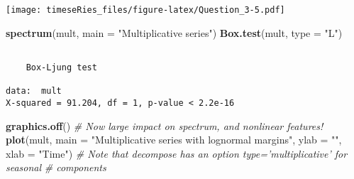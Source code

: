 \documentclass[]{book}
\newenvironment{Shaded}{\begin{snugshade}}{\end{snugshade}}
\newcommand{\KeywordTok}[1]{\textcolor[rgb]{0.13,0.29,0.53}{\textbf{#1}}}
\newcommand{\DataTypeTok}[1]{\textcolor[rgb]{0.13,0.29,0.53}{#1}}
\newcommand{\DecValTok}[1]{\textcolor[rgb]{0.00,0.00,0.81}{#1}}
\newcommand{\StringTok}[1]{\textcolor[rgb]{0.31,0.60,0.02}{#1}}
\newcommand{\CommentTok}[1]{\textcolor[rgb]{0.56,0.35,0.01}{\textit{#1}}}
\newcommand{\ControlFlowTok}[1]{\textcolor[rgb]{0.13,0.29,0.53}{\textbf{#1}}}
\newcommand{\OperatorTok}[1]{\textcolor[rgb]{0.81,0.36,0.00}{\textbf{#1}}}
\newcommand{\NormalTok}[1]{#1}
\begin{document}
\begin{Shaded}
\end{Shaded}

\texttt{[image: timeseRies\_files/figure-latex/Question\_3-5.pdf]}

\begin{Shaded}
\begin{Highlighting}[]
\KeywordTok{spectrum}\NormalTok{(mult, }\DataTypeTok{main =} \StringTok{"Multiplicative series"}\NormalTok{)}
\KeywordTok{Box.test}\NormalTok{(mult, }\DataTypeTok{type =} \StringTok{"L"}\NormalTok{)}
\end{Highlighting}
\end{Shaded}

\begin{verbatim}

    Box-Ljung test

data:  mult
X-squared = 91.204, df = 1, p-value < 2.2e-16
\end{verbatim}

\begin{Shaded}
\begin{Highlighting}[]
\KeywordTok{graphics.off}\NormalTok{()}
\CommentTok{# Now large impact on spectrum, and nonlinear features!}
\KeywordTok{plot}\NormalTok{(mult, }\DataTypeTok{main =} \StringTok{"Multiplicative series with lognormal margins"}\NormalTok{, }\DataTypeTok{ylab =} \StringTok{""}\NormalTok{, }
    \DataTypeTok{xlab =} \StringTok{"Time"}\NormalTok{)}
\CommentTok{# Note that decompose has an option type='multiplicative' for seasonal}
\CommentTok{# components}
\end{Highlighting}
\end{Shaded}
\end{document}
